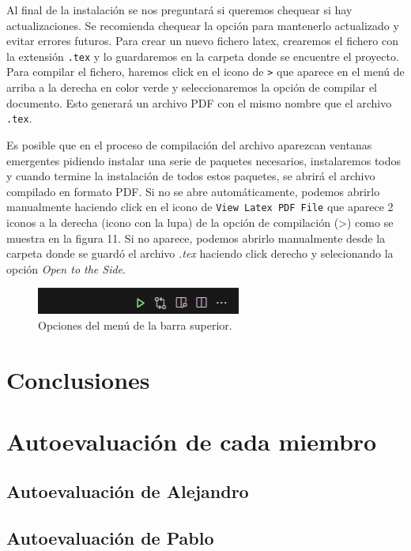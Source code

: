 \documentclass[a4paper]{article}
\begin{document}
Al final de la instalación se nos preguntará si queremos chequear si hay actualizaciones. Se recomienda chequear la opción para mantenerlo actualizado y evitar errores futuros.
Para crear un nuevo fichero latex, crearemos el fichero con la extensión \texttt{.tex} y lo guardaremos en la carpeta donde se encuentre el proyecto. Para compilar el fichero, haremos click en el icono de \texttt{>} que aparece en el menú de arriba a la derecha en color verde y seleccionaremos la opción de compilar el documento. Esto generará un archivo PDF con el mismo nombre que el archivo \texttt{.tex}.

Es posible que en el proceso de compilación del archivo aparezcan ventanas emergentes pidiendo instalar una serie de paquetes necesarios, instalaremos todos y cuando termine la instalación de todos estos paquetes, se abrirá el archivo compilado en formato PDF. Si no se abre automáticamente, podemos abrirlo manualmente haciendo click en el icono de \texttt{View Latex PDF File} que aparece 2 iconos a la derecha (icono con la lupa) de la opción de compilación (>) como se muestra en la figura 11. Si no aparece, podemos abrirlo manualmente desde la carpeta donde se guardó el archivo \textit{.tex} haciendo click derecho y selecionando la opción \textit{Open to the Side}.

\begin{figure}[h!]
    \centering
    \includegraphics[width=0.6\textwidth]{../img/menu.png}
    \caption{Opciones del menú de la barra superior.}
\end{figure}

\section{Conclusiones}

\section{Autoevaluación de cada miembro}

\subsection{Autoevaluación de Alejandro}

\subsection{Autoevaluación de Pablo}
\end{document}
